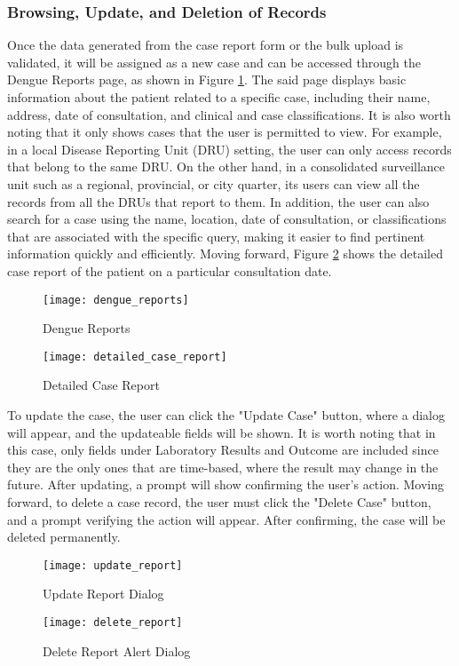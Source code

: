 \subsubsection{Browsing, Update, and Deletion of Records}
Once the data generated from the case report form or the bulk upload is validated, it will be assigned as a new case and can be accessed through the Dengue Reports page, as shown in Figure \ref{fig:dengue_reports}. The said page displays basic information about the patient related to a specific case, including their name, address, date of consultation, and clinical and case classifications. It is also worth noting that it only shows cases that the user is permitted to view. For example, in a local Disease Reporting Unit (DRU) setting, the user can only access records that belong to the same DRU. On the other hand, in a consolidated surveillance unit such as a regional, provincial, or city quarter, its users can view all the records from all the DRUs that report to them. In addition, the user can also search for a case using the name, location, date of consultation, or classifications that are associated with the specific query, making it easier to find pertinent information quickly and efficiently. Moving forward, Figure \ref{fig:detailed_case_report} shows the detailed case report of the patient on a particular consultation date. 
\begin{figure}[H]
	\centering
	\texttt{[image: dengue\_reports]}
	\caption{Dengue Reports}
	\label{fig:dengue_reports}
\end{figure}
\begin{figure}[H]
	\centering
	\texttt{[image: detailed\_case\_report]}
	\caption{Detailed Case Report}
	\label{fig:detailed_case_report}
\end{figure}

To update the case, the user can click the "Update Case" button, where a dialog will appear, and the updateable fields will be shown. It is worth noting that in this case, only fields under Laboratory Results and Outcome are included since they are the only ones that are time-based, where the result may change in the future. After updating, a prompt will show confirming the user's action. Moving forward, to delete a case record, the user must click the "Delete Case" button, and a prompt verifying the action will appear. After confirming, the case will be deleted permanently.

\begin{figure}[H]
	\centering
	\texttt{[image: update\_report]}
	\caption{Update Report Dialog}
	\label{fig:update_report}
\end{figure}
\begin{figure}[H]
	\centering
	\texttt{[image: delete\_report]}
	\caption{Delete Report Alert Dialog}
	\label{fig:delete_report}
\end{figure}

